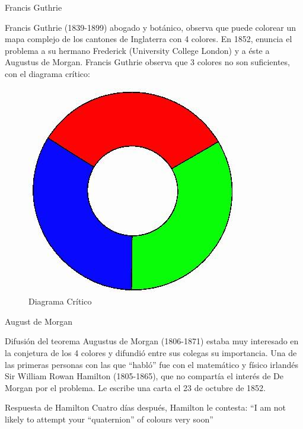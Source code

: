 \documentclass[spanish,utf8]{beamer}
\begin{document}
\begin{frame}{Francis Guthrie}
\begin{flushright}
\begin{block}{}
Francis Guthrie (1839-1899) abogado y botánico, observa que puede colorear un mapa complejo de los cantones de Inglaterra con 4 colores. En 1852, enuncia el problema a su hermano Frederick (University College London) y a éste a Augustus de Morgan. Francis Guthrie observa que 3 colores no son suficientes, con el diagrama crítico:
\end{block}
\begin{figure}
  \includegraphics[scale=0.3]{diagrama.jpg}
    \caption{Diagrama Crítico}
\end{figure}
\end{flushright}
\end{frame}
\begin{frame}{August de Morgan}
\begin{block}{Difusión del teorema}
Augustus de Morgan (1806-1871) estaba muy interesado en la conjetura de los 4 colores y difundió entre sus colegas su importancia. Una de las primeras personas con las que “habló” fue con el matemático y físico irlandés Sir William Rowan Hamilton (1805-1865), que no compartía el interés de De Morgan por el problema. Le escribe una carta el 23 de octubre de 1852.
\end{block}

\begin{block}{Respuesta de Hamilton}
Cuatro días después, Hamilton le contesta: “I am not likely to attempt your “quaternion” of colours very soon”
\end{block}    
\end{frame}
\end{document}
